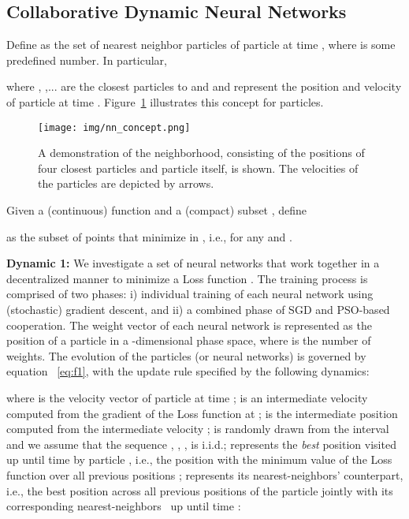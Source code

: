 \documentclass[fleqn,10pt]{wlscirep}
\begin{document}
\subsection{Collaborative Dynamic Neural Networks}
\label{sec:collab}
Define  as the set of  nearest neighbor particles of particle  at time , where  is some predefined number. In particular, 

where , ,...  are the  closest particles to  and  and  represent the position and velocity of particle  at time . Figure~\ref{fig:nn_concept} illustrates this concept for  particles.
\begin{figure} [hbt]
\begin{center}
\texttt{[image: img/nn\_concept.png]}
\caption{A demonstration of the  neighborhood, consisting of the positions of four closest particles and particle  itself, is shown. The velocities of the particles are depicted by arrows.}
\label{fig:nn_concept}
\end{center}
\end{figure}


Given a (continuous) function  and a (compact) subset , define

as the subset of points that minimize  in , i.e.,  for any  and .




\textbf{Dynamic 1:}  We investigate a set of neural networks that work together in a decentralized manner to minimize a Loss function . The training process is comprised of two phases: i) individual training of each neural network using (stochastic) gradient descent, and ii) a combined phase of SGD and PSO-based cooperation. The weight vector of each neural network is represented as the position of a particle in a -dimensional phase space, where  is the number of weights. The evolution of the particles (or neural networks) is governed by equation ~\eqref{eq:f1}, with the update rule specified by the following dynamics:

where  is the velocity vector of particle  at time ;  is an intermediate velocity computed from the gradient of the Loss function at ;  is the intermediate position computed from the intermediate velocity ;  is randomly drawn from the interval  and we assume that the sequence , , ,  is i.i.d.;  represents the \emph{best} position visited up until time  by particle , i.e., the position with the minimum value of the Loss function over all previous positions ;  represents its nearest-neighbors' counterpart, i.e., the best position across all previous positions of the particle  jointly with its corresponding nearest-neighbors~ up until time : 
\end{document}

